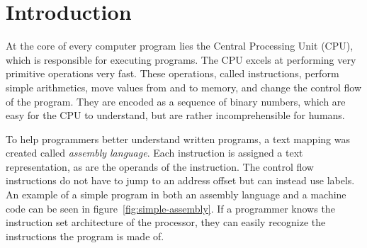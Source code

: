 \chapter{Introduction}
At the core of every computer program lies the Central Processing Unit (CPU),
which is responsible for executing programs. The CPU excels at performing very
primitive operations very fast. These operations, called instructions, perform
simple arithmetics, move values from and to memory, and change the control flow
of the program. They are encoded as a sequence of binary numbers, which are
easy for the CPU to understand, but are rather incomprehensible for humans.

To help programmers better understand written programs, a text mapping was
created called \textit{assembly language}. Each instruction is assigned a text
representation, as are the operands of the instruction. The control flow
instructions do not have to jump to an address offset but can instead use
labels. An example of a simple program in both an assembly language and a
machine code can be seen in figure~\ref{fig:simple-assembly}. If a programmer
knows the instruction set architecture of the processor, they can easily
recognize the instructions the program is made of.

